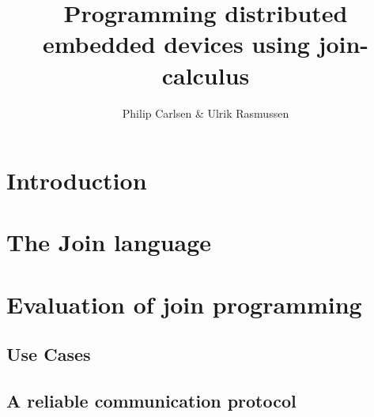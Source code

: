 \documentclass[a4paper, oneside, draft, 10pt]{memoir}
\title{Programming distributed embedded devices using join-calculus}
\author{Philip Carlsen \& Ulrik Rasmussen}
\begin{document}

\lstset{language=join,
        basicstyle=\small
}

\frontmatter

\maketitle
\iffalse
\begin{abstract}

\end{abstract}

\clearpage
\chapter*{Preface}


\clearpage

\tableofcontents*

\fi
\mainmatter

\chapter{Introduction}


\chapter{The Join language}


\chapter{Evaluation of join programming}

\section{Use Cases}

\section{A reliable communication protocol}





\end{document}
